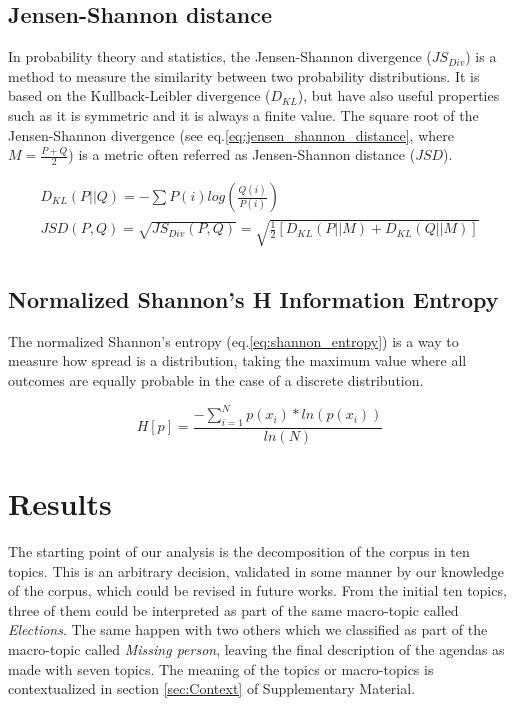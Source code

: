 \documentclass[10pt,letterpaper]{article}
\begin{document}
\subsection*{Jensen-Shannon distance}

\par In probability theory and statistics, the Jensen-Shannon divergence ($JS_{Div}$) is a method to measure the similarity between two probability distributions. It is based on the Kullback-Leibler divergence ($D_{KL}$), but have also useful properties such as it is symmetric and it is always a finite value. The square root of the Jensen-Shannon divergence (see eq.\ref{eq:jensen_shannon_distance}, where $M = \frac{P + Q}{2}$) is a metric \cite{fuglede2004jensen} often referred as Jensen-Shannon distance ($JSD$).

\begin{equation}
\begin{split}
D_{KL}(P||Q) = -\sum{P(i) log(\frac{Q(i)}{P(i)})} \\
JSD(P,Q) = \sqrt{JS_{Div}(P,Q)} = \sqrt{\frac{1}{2}[D_{KL}(P||M) + D_{KL}(Q||M)] } \\
\end{split}
\label{eq:jensen_shannon_distance}
\end{equation}


\subsection*{Normalized Shannon's H Information Entropy}

\par The normalized Shannon's entropy (eq.\ref{eq:shannon_entropy}) is a way to measure how spread is a distribution, taking the maximum value where all outcomes are equally probable in the case of a discrete distribution.

\begin{equation}
H[p] = \frac{- \sum_{i = 1}^{N} p(x_i) * ln(p(x_i))}{ln(N)}
\label{eq:shannon_entropy}
\end{equation}

\section*{Results}

\par The starting point of our analysis is the decomposition of the corpus in ten topics. This is an arbitrary decision, validated in some manner by our knowledge of the corpus, which could be revised in future works.  From the initial ten topics, three of them could be interpreted as part of the same macro-topic called \emph{Elections}. The same happen with two others which we classified as part of the macro-topic called \emph{Missing person}, leaving the  final description of the agendas as made with seven topics. The meaning of the topics or macro-topics is contextualized in section \ref{sec:Context} of Supplementary Material. 
\end{document}
